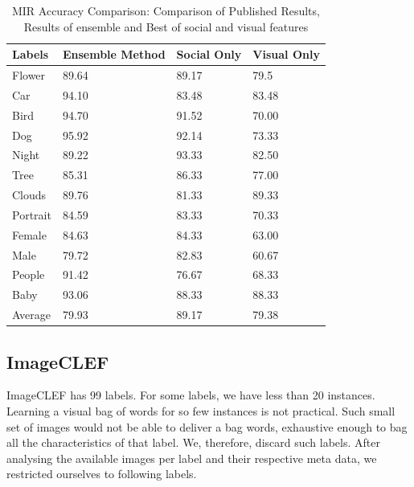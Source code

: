 \begin{table}
\centering
\caption{ MIR Accuracy Comparison: Comparison of Published Results, Results of ensemble and Best of social and visual features} %
\vspace*{0.2 cm}
\begin{tabular}{| p{2cm}| p{1.5cm}|p{1.2cm}|p{1.2cm}|} \hline
Labels & Ensemble Method & Social Only & Visual Only  \\  [1ex] \hline
Flower & 89.64 & 89.17 & 79.5 \\  [1ex] \hline
Car & 94.10 & 83.48 & 83.48 \\  [1ex] \hline
Bird & 94.70 & 91.52 & 70.00 \\  [1ex] \hline
Dog & 95.92 & 92.14 & 73.33 \\  [1ex] \hline
Night & 89.22 & 93.33 & 82.50 \\  [1ex] \hline
Tree & 85.31 & 86.33 & 77.00 \\  [1ex] \hline
Clouds & 89.76 & 81.33 & 89.33 \\  [1ex] \hline
Portrait & 84.59 & 83.33 & 70.33 \\  [1ex] \hline
Female & 84.63 & 84.33 & 63.00 \\  [1ex] \hline
Male & 79.72 & 82.83 & 60.67 \\  [1ex] \hline
People & 91.42 & 76.67 & 68.33 \\  [1ex] \hline
Baby & 93.06 & 88.33 & 88.33 \\  [1ex] \hline
Average & 79.93 & 89.17 & 79.38 \\  [1ex] \hline
\end{tabular}
 \label{MIRAccuracyOverAll} %
\end{table}




\subsection{ImageCLEF}
ImageCLEF has 99 labels. For some labels, we have less than 20 instances. Learning a visual bag of words for so few instances is not practical. Such small set of images would not be able to deliver a bag words, exhaustive enough to bag all the characteristics of that label. We, therefore, discard such labels. After analysing the available images per label and their respective meta data, we restricted ourselves to following labels.

